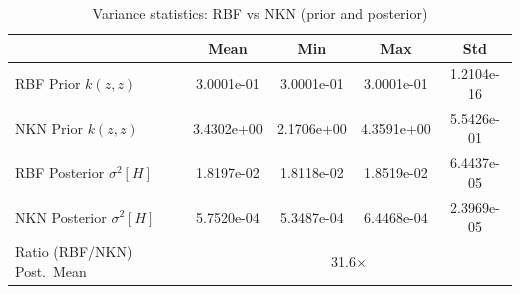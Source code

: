 
\begin{table}[h]
\centering
\caption{Variance statistics: RBF vs NKN (prior and posterior)}
\begin{tabular}{l c c c c}
\hline
 & Mean & Min & Max & Std \\
\hline
RBF Prior $k(z,z)$ & 3.0001e-01 & 3.0001e-01 & 3.0001e-01 & 1.2104e-16 \\
NKN Prior $k(z,z)$ & 3.4302e+00 & 2.1706e+00 & 4.3591e+00 & 5.5426e-01 \\
\hline
RBF Posterior $\sigma^2[H]$ & 1.8197e-02 & 1.8118e-02 & 1.8519e-02 & 6.4437e-05 \\
NKN Posterior $\sigma^2[H]$ & 5.7520e-04 & 5.3487e-04 & 6.4468e-04 & 2.3969e-05 \\
\hline
Ratio (RBF/NKN) Post.\ Mean & \multicolumn{4}{c}{31.6$\times$} \\
\hline
\end{tabular}
\end{table}
